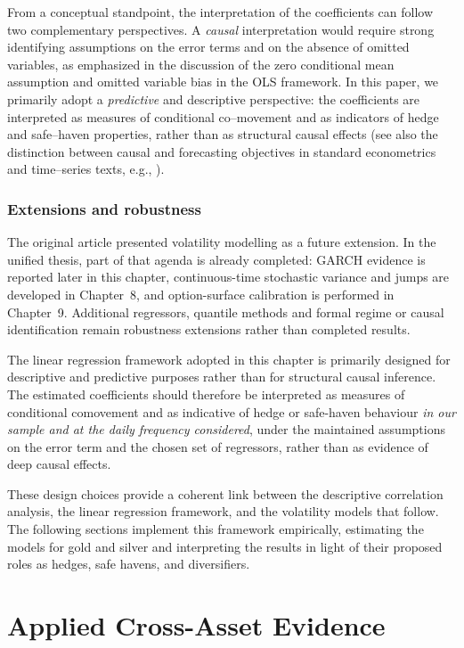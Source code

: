 From a conceptual standpoint, the interpretation of the coefficients can follow two
complementary perspectives. A \emph{causal} interpretation would require strong identifying
assumptions on the error terms and on the absence of omitted variables, as emphasized in
the discussion of the zero conditional mean assumption and omitted variable bias in the
OLS framework. In this paper, we primarily adopt a \emph{predictive} and descriptive
perspective: the coefficients are interpreted as measures of conditional co–movement and as
indicators of hedge and safe–haven properties, rather than as structural causal effects
(see also the distinction between causal and forecasting objectives in standard
econometrics and time–series texts, e.g., ).
\subsubsection{Extensions and robustness}

The original article presented volatility modelling as a future extension. In
the unified thesis, part of that agenda is already completed: GARCH evidence is
reported later in this chapter, continuous-time stochastic variance and jumps
are developed in Chapter~8, and option-surface calibration is performed in
Chapter~9. Additional regressors, quantile methods and formal regime or causal
identification remain robustness extensions rather than completed results.

The linear regression framework adopted in this chapter is primarily designed for descriptive and predictive purposes rather than for structural causal inference. The estimated coefficients should therefore be interpreted as measures of conditional comovement and as indicative of hedge or safe-haven behaviour \emph{in our sample and at the daily frequency considered}, under the maintained assumptions on the error term and the chosen set of regressors, rather than as evidence of deep causal effects.


These design choices provide a coherent link between the descriptive correlation analysis,
the linear regression framework, and the volatility models that follow. The following
sections implement this framework empirically, estimating the models for gold and silver
and interpreting the results in light of their proposed roles as hedges, safe havens, and
diversifiers.


\section{Applied Cross-Asset Evidence}

